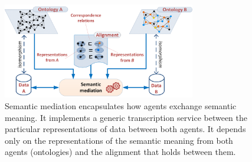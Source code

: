 \documentclass[sort&compress,preprint,authoryear,3p,twocolumn]{elsarticle}
\begin{document}
\begin{figure}
\hypertarget{fig:rt-mediation}{%
\centering
\includegraphics[width=0.75\textwidth,height=\textheight]{src/images/RunTimeMediation.png}
\caption{Semantic mediation encapsulates how agents exchange semantic
meaning. It implements a generic transcription service between the
particular representations of data between both agents. It depends only
on the representations of the semantic meaning from both agents
(ontologies) and the alignment that holds between
them.}\label{fig:rt-mediation}
}
\end{figure}
\end{document}
